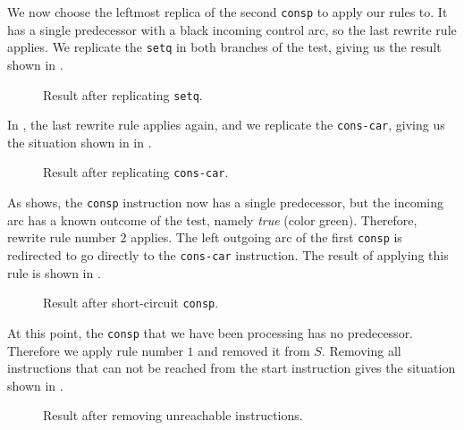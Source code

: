 We now choose the leftmost replica of the second \texttt{consp} to
apply our rules to.  It has a single predecessor with a black incoming
control arc, so the last rewrite rule applies.  We replicate the
\texttt{setq} in both branches of the test, giving us the result shown
in .

\begin{figure}
\begin{center}
\end{center}
\caption{\label{fig-rewrite-4}
Result after replicating \texttt{setq}.}
\end{figure}

In , the last rewrite rule applies again, and we
replicate the \texttt{cons-car}, giving us the situation shown in in
.

\begin{figure}
\begin{center}
\end{center}
\caption{\label{fig-rewrite-5}
Result after replicating \texttt{cons-car}.}
\end{figure}

As  shows, the \texttt{consp} instruction now
has a single predecessor, but the incoming arc has a known outcome of
the test, namely \textit{true} (color green).  Therefore, rewrite rule
number $2$ applies.  The left outgoing arc of the first \texttt{consp}
is redirected to go directly to the \texttt{cons-car} instruction.
The result of applying this rule is shown in .

\begin{figure}
\begin{center}
\end{center}
\caption{\label{fig-rewrite-6}
Result after short-circuit \texttt{consp}.}
\end{figure}

At this point, the \texttt{consp} that we have been processing has no
predecessor.  Therefore we apply rule number $1$ and removed it from
$S$.  Removing all instructions that can not be reached from the start
instruction gives the situation shown in .

\begin{figure}
\begin{center}
\end{center}
\caption{\label{fig-rewrite-7}
Result after removing unreachable instructions.}
\end{figure}


